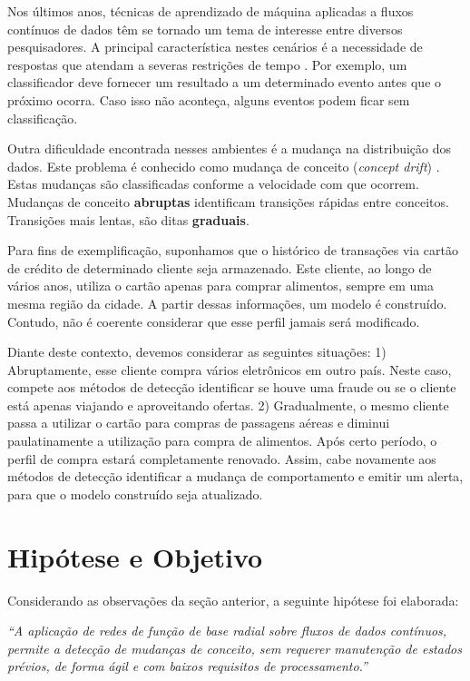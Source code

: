 \documentclass[qual, classic, a4paper]{ufbathesis}
\begin{document}
Nos últimos anos, técnicas de aprendizado de máquina aplicadas a fluxos contínuos de dados têm se tornado um tema de interesse entre diversos pesquisadores.
A principal característica nestes cenários é a necessidade de respostas que atendam a severas restrições de tempo \cite{Gama:2010:KDD:1855075}. 
Por exemplo, um classificador deve fornecer um resultado a um determinado evento antes que o próximo ocorra. 
Caso isso não aconteça, alguns eventos podem ficar sem classificação.

Outra dificuldade encontrada nesses ambientes é a mudança na distribuição dos dados. 
Este problema é conhecido como mudança de conceito (\textit{concept drift}) \cite{Gama:2010:KDD:1855075}.
Estas mudanças são classificadas conforme a velocidade com que ocorrem.
Mudanças de conceito \textbf{abruptas} identificam transições rápidas entre conceitos. 
Transições mais lentas, são ditas \textbf{graduais}.

Para fins de exemplificação, suponhamos que o histórico de transações via cartão de crédito de determinado cliente seja armazenado.
Este cliente, ao longo de vários anos, utiliza o cartão apenas para comprar alimentos, sempre em uma mesma região da cidade.
A partir dessas informações, um modelo é construído.
Contudo, não é coerente considerar que esse perfil jamais será modificado. 

Diante deste contexto, devemos considerar as seguintes situações:
1) Abruptamente, esse cliente compra vários eletrônicos em outro país.
Neste caso, compete aos métodos de detecção identificar se houve uma fraude ou se o cliente está apenas viajando e aproveitando ofertas.
2) Gradualmente, o mesmo cliente passa a utilizar o cartão para compras de passagens aéreas e diminui paulatinamente a utilização para compra de alimentos.
Após certo período, o perfil de compra estará completamente renovado.
Assim, cabe novamente aos métodos de detecção identificar a mudança de comportamento e emitir um alerta, 
para que o modelo construído seja atualizado.

\section{Hipótese e Objetivo}

Considerando as observações da seção anterior, a seguinte hipótese foi elaborada:

\begin{center}
\textit{``A aplicação de redes de função de base radial sobre fluxos de dados contínuos, permite a detecção de mudanças de conceito, sem requerer manutenção de estados prévios, de forma ágil e com baixos requisitos de processamento.''}
\end{center}
\end{document}
